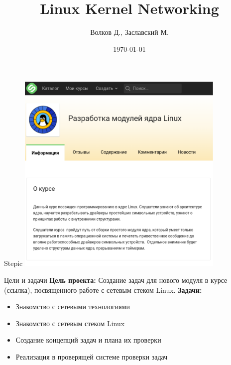 \documentclass{beamer}
\begin{document}
\title{Linux Kernel Networking}  
\author{Волков Д., Заславский М.}
\date{\today} 

\frame{\titlepage} 

\begin{frame}{Stepic}
	\includegraphics[width=100mm]{./stepic.pdf}
\end{frame}

\begin{frame}{Цели и задачи}
	\textbf{Цель проекта:} 
        Создание задач для нового модуля в курсе (ссылка), посвященного работе с сетевым стеком Linux.
	\textbf{Задачи:}
	\begin{itemize}
		\item Знакомство с сетевыми технологиями 
		\item Знакомство с сетевым стеком Linux
		\item Создание концепций задач и плана их проверки
		\item Реализация в проверящей системе проверки задач
	\end{itemize}
\end{frame}
\end{document}
